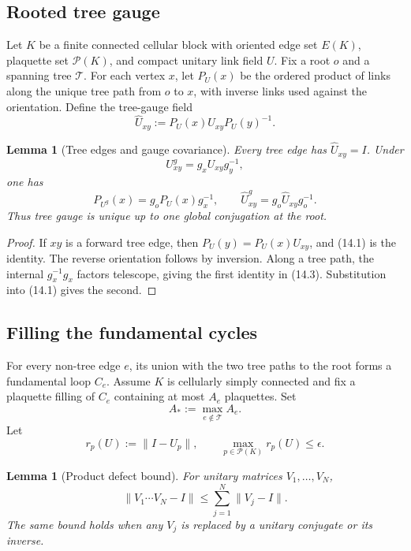 \documentclass[11pt]{article}
\newtheorem{lemma}[theorem]{Lemma}
\begin{document}
\subsection{Rooted tree gauge}

Let \(K\) be a finite connected cellular block with oriented edge set
\(E(K)\), plaquette set \(\mathcal P(K)\), and compact unitary link field
\(U\).  Fix a root \(o\) and a spanning tree \(\mathcal T\).  For each
vertex \(x\), let \(P_U(x)\) be the ordered product of links along the
unique tree path from \(o\) to \(x\), with inverse links used against the
orientation.  Define the tree-gauge field
\[
 \widehat U_{xy}:=
 P_U(x)U_{xy}P_U(y)^{-1}.
 \tag{14.1}
\]

\begin{lemma}[Tree edges and gauge covariance]
\label{lem:v11v14-tree}
Every tree edge has \(\widehat U_{xy}=I\).  Under
\[
 U^g_{xy}=g_xU_{xy}g_y^{-1},
 \tag{14.2}
\]
one has
\[
 P_{U^g}(x)=g_oP_U(x)g_x^{-1},
 \qquad
 \widehat U^g_{xy}
 =
 g_o\widehat U_{xy}g_o^{-1}.
 \tag{14.3}
\]
Thus tree gauge is unique up to one global conjugation at the root.
\end{lemma}

\begin{proof}
If \(xy\) is a forward tree edge, then
\(P_U(y)=P_U(x)U_{xy}\), and (14.1) is the identity.  The reverse
orientation follows by inversion.  Along a tree path, the internal
\(g_x^{-1}g_x\) factors telescope, giving the first identity in (14.3).
Substitution into (14.1) gives the second.
\end{proof}

\subsection{Filling the fundamental cycles}

For every non-tree edge \(e\), its union with the two tree paths to the
root forms a fundamental loop \(C_e\).  Assume \(K\) is cellularly
simply connected and fix a plaquette filling of \(C_e\) containing at
most \(A_e\) plaquettes.  Set
\[
 A_*:=\max_{e\notin\mathcal T}A_e.
 \tag{14.4}
\]
Let
\[
 r_p(U):=\|I-U_p\|,
 \qquad
 \max_{p\in\mathcal P(K)}r_p(U)\leq\epsilon.
 \tag{14.5}
\]

\begin{lemma}[Product defect bound]
\label{lem:v11v14-product}
For unitary matrices \(V_1,\ldots,V_N\),
\[
 \|V_1\cdots V_N-I\|
 \leq\sum_{j=1}^N\|V_j-I\|.
 \tag{14.6}
\]
The same bound holds when any \(V_j\) is replaced by a unitary conjugate
or its inverse.
\end{lemma}
\end{document}

